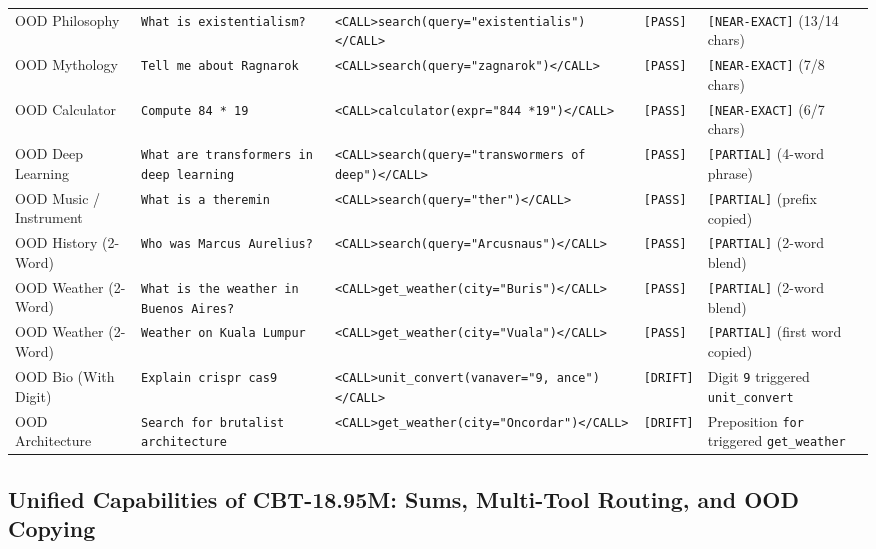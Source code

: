 \documentclass[10pt,twocolumn]{article}
\begin{document}
\begin{table}[t]
{\begin{tabular}{@{}lllll@{}}
OOD Philosophy & \texttt{What is existentialism?} & \texttt{<CALL>search(query="existentialis")</CALL>} & \texttt{[PASS]} & \texttt{[NEAR-EXACT]} (13/14 chars) \\
OOD Mythology & \texttt{Tell me about Ragnarok} & \texttt{<CALL>search(query="zagnarok")</CALL>} & \texttt{[PASS]} & \texttt{[NEAR-EXACT]} (7/8 chars) \\
OOD Calculator & \texttt{Compute 84 * 19} & \texttt{<CALL>calculator(expr="844 *19")</CALL>} & \texttt{[PASS]} & \texttt{[NEAR-EXACT]} (6/7 chars) \\
OOD Deep Learning & \texttt{What are transformers in deep learning} & \texttt{<CALL>search(query="transwormers of deep")</CALL>} & \texttt{[PASS]} & \texttt{[PARTIAL]} (4-word phrase) \\
OOD Music / Instrument & \texttt{What is a theremin} & \texttt{<CALL>search(query="ther")</CALL>} & \texttt{[PASS]} & \texttt{[PARTIAL]} (prefix copied) \\
OOD History (2-Word) & \texttt{Who was Marcus Aurelius?} & \texttt{<CALL>search(query="Arcusnaus")</CALL>} & \texttt{[PASS]} & \texttt{[PARTIAL]} (2-word blend) \\
OOD Weather (2-Word) & \texttt{What is the weather in Buenos Aires?} & \texttt{<CALL>get\_weather(city="Buris")</CALL>} & \texttt{[PASS]} & \texttt{[PARTIAL]} (2-word blend) \\
OOD Weather (2-Word) & \texttt{Weather on Kuala Lumpur} & \texttt{<CALL>get\_weather(city="Vuala")</CALL>} & \texttt{[PASS]} & \texttt{[PARTIAL]} (first word copied) \\
OOD Bio (With Digit) & \texttt{Explain crispr cas9} & \texttt{<CALL>unit\_convert(vanaver="9, ance")</CALL>} & \texttt{[DRIFT]} & Digit \texttt{9} triggered \texttt{unit\_convert} \\
OOD Architecture & \texttt{Search for brutalist architecture} & \texttt{<CALL>get\_weather(city="Oncordar")</CALL>} & \texttt{[DRIFT]} & Preposition \texttt{for} triggered \texttt{get\_weather} \\
\bottomrule
\end{tabular}%
}
\end{table}

\subsection{Unified Capabilities of CBT-18.95M: Sums, Multi-Tool Routing, and OOD Copying}
\end{document}
